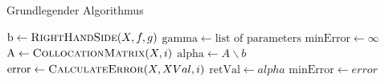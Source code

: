 \begin{algorithm}
\caption{Grundlegender Algorithmus}
\label{alg:Grund}
\begin{algorithmic}[1]

\State $\mathrm{b} \gets \Call{RightHandSide}{X,f,g}$
\State $\mathrm{gamma} \gets \text{list of parameters}$
\State $\mathrm{minError} \gets \infty$
	\State $\mathrm{A} \gets \Call{CollocationMatrix}{X, i}$
	\State $\mathrm{alpha} \gets A\backslash b$
	\State $\mathrm{error} \gets \Call{CalculateError}{X, XVal, i}$
		\State $\mathrm{retVal} \gets alpha$
		\State $\mathrm{minError} \gets error$
	\EndIf
\EndFor
\State {}
\EndFunction
\end{algorithmic}
\end{algorithm}